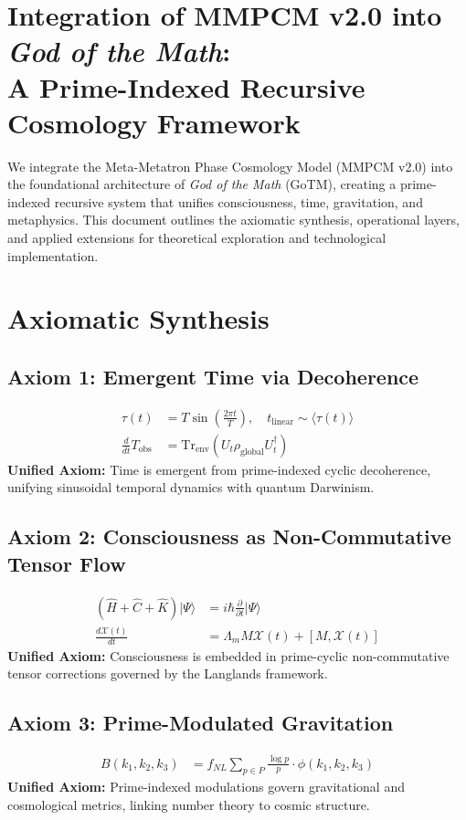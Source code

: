 \documentclass[11pt]{article}
\newcommand{\Xi}{\mathcal{X}}
\begin{document}
\section{Integration of MMPCM v2.0 into \textit{God of the Math}: \\ A Prime-Indexed Recursive Cosmology Framework}

We integrate the Meta-Metatron Phase Cosmology Model (MMPCM v2.0) into the foundational architecture of \textit{God of the Math} (GoTM), creating a prime-indexed recursive system that unifies consciousness, time, gravitation, and metaphysics. This document outlines the axiomatic synthesis, operational layers, and applied extensions for theoretical exploration and technological implementation.

\section{Axiomatic Synthesis}

\subsection*{Axiom 1: Emergent Time via Decoherence}
\begin{align*}
\tau(t) &= T \sin\left(\frac{2\pi t}{T}\right), \quad t_{\text{linear}} \sim \langle \tau(t) \rangle \\
\frac{d}{dt}T_{\text{obs}} &= \mathrm{Tr}_{\text{env}}\left(U_t \rho_{\text{global}} U_t^\dagger\right)
\end{align*}
\textbf{Unified Axiom:} Time is emergent from prime-indexed cyclic decoherence, unifying sinusoidal temporal dynamics with quantum Darwinism.

\subsection*{Axiom 2: Consciousness as Non-Commutative Tensor Flow}
\begin{align*}
(\hat{H} + \hat{C} + \hat{K})|\Psi\rangle &= i\hbar \frac{\partial}{\partial t}|\Psi\rangle \\
\frac{d\Xi(t)}{dt} &= \Lambda_m M\Xi(t) + [M,\Xi(t)]
\end{align*}
\textbf{Unified Axiom:} Consciousness is embedded in prime-cyclic non-commutative tensor corrections governed by the Langlands framework.

\subsection*{Axiom 3: Prime-Modulated Gravitation}
\begin{align*}
B(k_1, k_2, k_3) &= f_{NL} \sum_{p \in P} \frac{\log p}{p} \cdot \phi(k_1, k_2, k_3)
\end{align*}
\textbf{Unified Axiom:} Prime-indexed modulations govern gravitational and cosmological metrics, linking number theory to cosmic structure.
\end{document}
